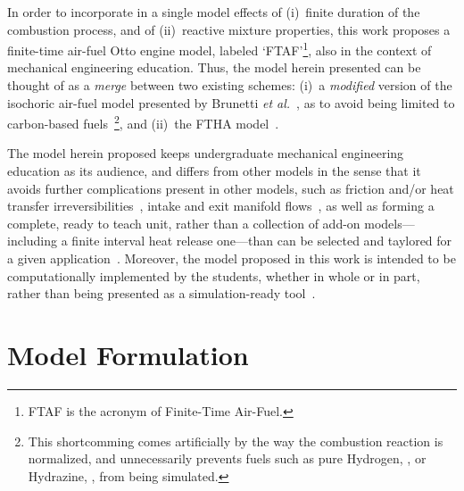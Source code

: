     In order to incorporate in a single model effects of (i)~finite duration of the combustion  process,  and  of  (ii)~reactive
    mixture properties, this work proposes a finite-time air-fuel Otto engine model, labeled `FTAF'\footnote{FTAF is the acronym
    of Finite-Time Air-Fuel.}, also in the context of mechanical engineering education. Thus, the model herein presented can  be
    thought of as a \emph{merge} between two existing schemes: (i)~a \emph{modified} version of  the  isochoric  air-fuel  model
    presented  by  Brunetti  \emph{et  al.\/}~\cite{2012-BrunettiF-Blucher},  as  to  avoid  being   limited   to   carbon-based
    fuels~\footnote{This shortcomming comes artificially by the way the combustion reaction  is  normalized,  and  unnecessarily
    prevents fuels such as pure  Hydrogen,  ,  or  Hydrazine,  ,  from  being  simulated.},  and  (ii)~the  FTHA
    model~\cite{2017-NaaktgeborenC-IntJMechEngEduc}.

    The model herein proposed keeps undergraduate mechanical engineering education as  its  audience,  and  differs  from  other
    models in the sense that it avoids further complications present in other models, such  as  friction  and/or  heat  transfer
    irreversibilities~\cite{2008-CurtoRissoPL+HernandezAC-JApplPhys, 2002-CatonJA-IntJMechEngEduc},  intake  and  exit  manifold
    flows~\cite{2001-CatonJA-IntJMechEngEduc}, as well as forming a complete, ready to teach unit, rather than a  collection  of
    add-on  models---including  a  finite  interval  heat  release  one---than  can  be  selected  and  taylored  for  a   given
    application~\cite{2013-MartinsJJG-Publindustria}.  Moreover,  the  model  proposed  in  this  work   is   intended   to   be
    computationally implemented by the students, whether in whole or in part, rather than being presented as a  simulation-ready
    tool~\cite{2011-ZuecoJ-IntJMechEngEduc}.



\section{Model Formulation}

